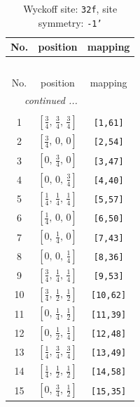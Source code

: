 \documentclass[fleqn,8pt]{jsarticle}
\begin{document}
\begin{longtable}{ccc}
\caption{Wyckoff site: {\tt 32f}, site symmetry: {\tt -1'}}
 \\
 \hline \hline
No. & position & mapping \\ \hline \endfirsthead

\multicolumn{2}{l}{\tablename\ \thetable{}} \\
 \hline \hline
No. & position & mapping \\ \hline \endhead

 \hline \hline
\multicolumn{2}{r}{\footnotesize\it continued ...} \\ \endfoot

 \hline \hline
\multicolumn{2}{r}{} \\ \endlastfoot

1 & $\left[ \frac{3}{4},\, \frac{3}{4},\, \frac{3}{4} \right]$ & {\tt [1,61]} \\ \hline
2 & $\left[ \frac{3}{4},\, 0,\, 0 \right]$ & {\tt [2,54]} \\ \hline
3 & $\left[ 0,\, \frac{3}{4},\, 0 \right]$ & {\tt [3,47]} \\ \hline
4 & $\left[ 0,\, 0,\, \frac{3}{4} \right]$ & {\tt [4,40]} \\ \hline
5 & $\left[ \frac{1}{4},\, \frac{1}{4},\, \frac{1}{4} \right]$ & {\tt [5,57]} \\ \hline
6 & $\left[ \frac{1}{4},\, 0,\, 0 \right]$ & {\tt [6,50]} \\ \hline
7 & $\left[ 0,\, \frac{1}{4},\, 0 \right]$ & {\tt [7,43]} \\ \hline
8 & $\left[ 0,\, 0,\, \frac{1}{4} \right]$ & {\tt [8,36]} \\ \hline
9 & $\left[ \frac{3}{4},\, \frac{1}{4},\, \frac{1}{4} \right]$ & {\tt [9,53]} \\ \hline
10 & $\left[ \frac{3}{4},\, \frac{1}{2},\, \frac{1}{2} \right]$ & {\tt [10,62]} \\ \hline
11 & $\left[ 0,\, \frac{1}{4},\, \frac{1}{2} \right]$ & {\tt [11,39]} \\ \hline
12 & $\left[ 0,\, \frac{1}{2},\, \frac{1}{4} \right]$ & {\tt [12,48]} \\ \hline
13 & $\left[ \frac{1}{4},\, \frac{3}{4},\, \frac{3}{4} \right]$ & {\tt [13,49]} \\ \hline
14 & $\left[ \frac{1}{4},\, \frac{1}{2},\, \frac{1}{2} \right]$ & {\tt [14,58]} \\ \hline
15 & $\left[ 0,\, \frac{3}{4},\, \frac{1}{2} \right]$ & {\tt [15,35]} \\ \hline

\end{longtable}
\end{document}
